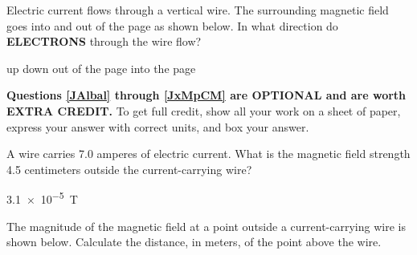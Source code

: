 \documentclass{exam}
\begin{document}
\begin{questions}
\question Electric current flows through a vertical wire. The surrounding magnetic field goes into and out of the page as shown below. In what direction do \textbf{ELECTRONS} through the wire flow?

\begin{center}
\end{center}

\begin{randomizechoices}
    \correctchoice up
    \choice down
    \choice out of the page
    \choice into the page
\end{randomizechoices}

\vspace{1em}

\cyanhrule

\begin{EnvUplevel}
\textbf{Questions \ref{JAlbal} through \ref{JxMpCM} are OPTIONAL and are worth EXTRA CREDIT.} To get full credit, show all your work on a sheet of paper, express your answer with correct units, and box your answer.
\end{EnvUplevel}

\question \label{JAlbal}
A wire carries 7.0 amperes of electric current. What is the magnetic field strength 4.5 centimeters outside the current-carrying wire? %

\begin{solution}
    \SI{3.1e-5}{T}
\end{solution}

\question
The magnitude of the magnetic field at a point outside a current-carrying wire is shown below. Calculate the distance, in meters, of the point above the wire.

\begin{center}
\end{center}


\end{questions}
\end{document}
